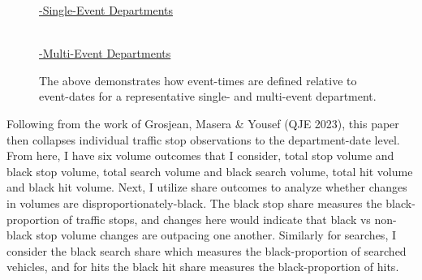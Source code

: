 \begin{figure}
	\begin{center}
		\noindent \underline{-Single-Event Departments} \\
		 \\
		\underline{-Multi-Event Departments} \\
		\caption[Event Timing Dragram]{The above demonstrates how event-times are defined relative to event-dates for a representative single- and multi-event department.}
		\label{etime_diagram}
	\end{center}
\end{figure}

Following from the work of Grosjean, Masera \& Yousef (QJE 2023), this paper then collapses individual traffic stop observations to the department-date level. From here, I have six volume outcomes that I consider, total stop volume and black stop volume, total search volume and black search volume, total hit volume and black hit volume. Next, I utilize share outcomes to analyze whether changes in volumes are disproportionately-black. The black stop share measures the black-proportion of traffic stops, and changes here would indicate that black vs non-black stop volume changes are outpacing one another. Similarly for searches, I consider the black search share which measures the black-proportion of searched vehicles, and for hits the black hit share measures the black-proportion of hits. \\

